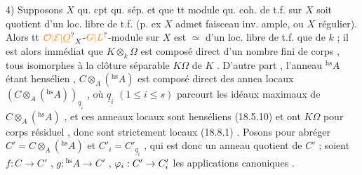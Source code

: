 4) Supposons $X$ qu. cpt qu. sép. et que
tt module qu. coh. de t.f. sur $X$
soit quotient d'un loc. libre de t.f.
(p. ex $X$ admet faisceau inv. ample,
ou $X$  régulier). Alors tt
$\unsure{\mathcal{O}|\mathcal{E}|\underline{O}}_X$-$\unsure{G|L}$-module sur $X$ est $\simeq$  d'un
loc. libre de t.f.
que de $k$ ; il est alors immédiat que $K\otimes_k\Omega$ est composé direct d'un nombre
fini de corps , tous isomorphes à la clôture séparable $K\Omega$ de $K$ . D'autre
part , l'anneau $ {}^{\mathrm{hs}}A$ étant hensélien , $C\otimes_A({}^{\mathrm{hs}}A)$ est composé direct des annea
locaux $(C\otimes_A({}^{\mathrm{hs}}A))_{\underline{q}_i}$ , où $\underline{q}_i$ $(1\leq i\leq s)$ parcourt les idéaux maximaux de 
$C\otimes_A({}^{\mathrm{hs}}A)$ , et ces anneaux locaux sont henséliens (18.5.10) et ont $K\Omega$ pour
corps résiduel , donc sont strictement locaux (18.8.1) . Posons pour abréger
$C'=C\otimes_A({}^{\mathrm{hs}}A)$ et $C'_i=C'_{\underline{q}_i}$ , qui est donc un anneau quotient de $C'$ ; soient
$f:C\to C'$ , $g:{}^{\mathrm{hs}}A\to C'$ , $\varphi_i:C'\to C'_i$ les applications canoniques .



